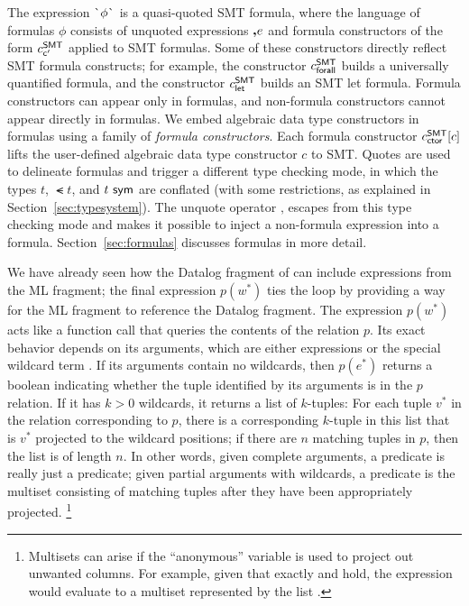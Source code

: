 \documentclass[acmsmall,screen,nonacm]{acmart}
\theoremstyle{definition}
\begin{document}
The expression $\textsf{\`{}}{\phi}\textsf{\`{}}$ is a quasi-quoted SMT formula, where the language of
formulas $\phi$ consists of unquoted expressions $\textbf{,}{e}$ and formula
constructors of the form $c^\mathsf{SMT}_{\mathsf{c'}}$ applied to SMT formulas.
Some of these constructors directly reflect SMT formula constructs; for
example, the constructor $c^\mathsf{SMT}_{\mathsf{forall}}$  builds a universally quantified formula,
and the constructor $c^\mathsf{SMT}_{\mathsf{let}}$ builds an SMT let formula.
Formula constructors can appear only in formulas, and non-formula constructors
cannot appear directly in formulas.
We embed algebraic data type constructors in formulas using a family of
\emph{formula constructors}. Each formula constructor $c^\mathsf{SMT}_{\mathsf{ctor}}[c]$ lifts the user-defined algebraic data type constructor $c$ to SMT.
Quotes are used to delineate formulas and trigger a different type checking
mode, in which the types $t$, $\smt{t}$, and ${t} ~ \mathsf{sym}$ are conflated (with some
restrictions, as explained in Section~\ref{sec:typesystem}).
The unquote operator $\textbf{,}$ escapes from this type checking mode and
makes it possible to inject a non-formula expression into a formula.
Section~\ref{sec:formulas} discusses formulas in more detail.

We have already seen how the Datalog fragment of \Name can include expressions
from the ML fragment; the final expression $p(w^*)$ ties the loop by
providing a way for the ML fragment to reference the Datalog fragment.
The expression $p(w^*)$ acts like a function call that queries the
contents of the relation $p$.
Its exact behavior depends on its arguments, which are either expressions or
the special wildcard term \wildcard.
If its arguments contain no wildcards, then $p(e^*)$ returns a boolean
indicating whether the tuple identified by its arguments is in the $p$
relation.
If it has $k > 0$ wildcards, it returns a list of $k$-tuples: For each tuple
$v^*$ in the relation corresponding to $p$, there is a corresponding $k$-tuple
in this list that is $v^*$ projected to the wildcard positions; if there are
$n$ matching tuples in $p$, then the list is of length $n$.
In other words, given complete arguments, a predicate is really just a
predicate; given partial arguments with wildcards, a predicate is the multiset
consisting of matching tuples after they have been appropriately projected.%
\footnote{Multisets can arise if the ``anonymous'' variable \icfoot{_} is used
to project out unwanted columns. For example, given that exactly  and  hold, the expression  would evaluate
to a multiset represented by the list \icfoot{[2, 2]}.}
\end{document}
